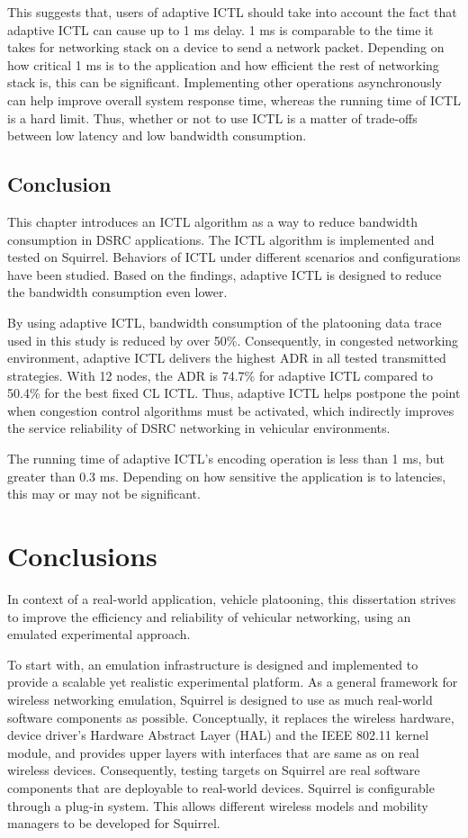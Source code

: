 \documentclass[12pt]{report}
\begin{document}
This suggests that, users of adaptive ICTL should take into account the fact that adaptive ICTL can cause up to 1 ms delay. 1 ms is comparable to the time it takes for networking stack on a device to send a network packet. Depending on how critical 1 ms is to the application and how efficient the rest of networking stack is, this can be significant. Implementing other operations asynchronously can help improve overall system response time, whereas the running time of ICTL is a hard limit. Thus, whether or not to use ICTL is a matter of trade-offs between low latency and low bandwidth consumption.

\section{Conclusion}

This chapter introduces an ICTL algorithm as a way to reduce bandwidth consumption in DSRC applications. The ICTL algorithm is implemented and tested on Squirrel. Behaviors of ICTL under different scenarios and configurations have been studied. Based on the findings, adaptive ICTL is designed to reduce the bandwidth consumption even lower.

By using adaptive ICTL, bandwidth consumption of the platooning data trace used in this study is reduced by over 50\%. Consequently, in congested networking environment, adaptive ICTL delivers the highest ADR in all tested transmitted strategies. With 12 nodes, the ADR is 74.7\% for adaptive ICTL compared to 50.4\% for the best fixed CL ICTL. Thus, adaptive ICTL helps postpone the point when congestion control algorithms must be activated, which indirectly improves the service reliability of DSRC networking in vehicular environments.

The running time of adaptive ICTL's encoding operation is less than 1 ms, but greater than 0.3 ms. Depending on how sensitive the application is to latencies, this may or may not be significant.

\chapter{Conclusions}

In context of a real-world application, vehicle platooning, this dissertation strives to improve the efficiency and reliability of vehicular networking, using an emulated experimental approach.

To start with, an emulation infrastructure is designed and implemented to provide a scalable yet realistic experimental platform. As a general framework for wireless networking emulation, Squirrel is designed to use as much real-world software components as possible. Conceptually, it replaces the wireless hardware, device driver's Hardware Abstract Layer (HAL) and the IEEE 802.11 kernel module, and provides upper layers with interfaces that are same as on real wireless devices. Consequently, testing targets on Squirrel are real software components that are deployable to real-world devices. Squirrel is configurable through a plug-in system. This allows different wireless models and mobility managers to be developed for Squirrel.
\end{document}
